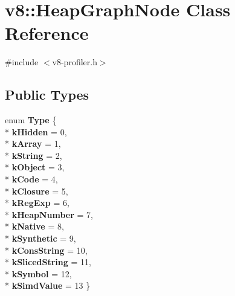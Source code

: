 \hypertarget{classv8_1_1_heap_graph_node}{}\section{v8\+:\+:Heap\+Graph\+Node Class Reference}
\label{classv8_1_1_heap_graph_node}


{\ttfamily \#include $<$v8-\/profiler.\+h$>$}

\subsection*{Public Types}
\begin{DoxyCompactItemize}
\item 
enum {\bfseries Type} \{ \\*
{\bfseries k\+Hidden} = 0, 
\\*
{\bfseries k\+Array} = 1, 
\\*
{\bfseries k\+String} = 2, 
\\*
{\bfseries k\+Object} = 3, 
\\*
{\bfseries k\+Code} = 4, 
\\*
{\bfseries k\+Closure} = 5, 
\\*
{\bfseries k\+Reg\+Exp} = 6, 
\\*
{\bfseries k\+Heap\+Number} = 7, 
\\*
{\bfseries k\+Native} = 8, 
\\*
{\bfseries k\+Synthetic} = 9, 
\\*
{\bfseries k\+Cons\+String} = 10, 
\\*
{\bfseries k\+Sliced\+String} = 11, 
\\*
{\bfseries k\+Symbol} = 12, 
\\*
{\bfseries k\+Simd\+Value} = 13
 \}\hypertarget{classv8_1_1_heap_graph_node_ab674a58103a51abc56f99edc6a1479ed}{}\label{classv8_1_1_heap_graph_node_ab674a58103a51abc56f99edc6a1479ed}

\end{DoxyCompactItemize}
